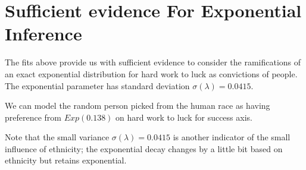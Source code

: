 \documentclass{amsart}
\begin{document}
\section{Sufficient evidence For Exponential Inference}

The fits above provide us with sufficient evidence to consider the ramifications of an exact exponential distribution for hard work to luck as convictions of people.  The exponential parameter has standard deviation $\sigma(\lambda) = 0.0415$.  

We can model the random person picked from the human race as having preference from $Exp(0.138)$ on hard work to luck for success axis.

Note that the small variance $\sigma(\lambda)=0.0415$ is another indicator of the small influence of ethnicity; the exponential decay changes by a little bit based on ethnicity but retains exponential.
\end{document}
